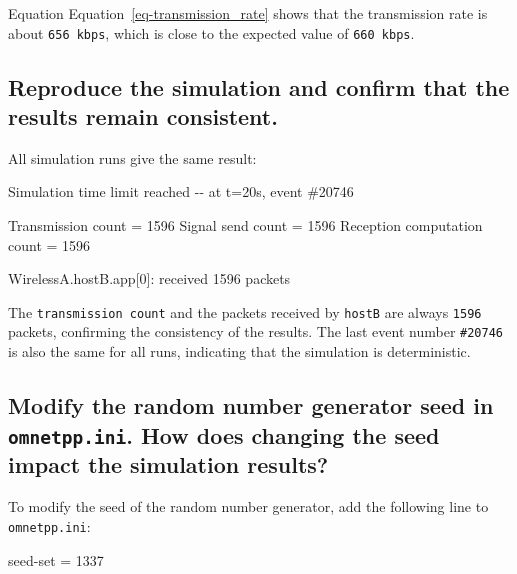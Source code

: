 \documentclass[
  letterpaper,
  DIV=11,
  numbers=noendperiod]{scrartcl}
\newenvironment{Shaded}{\begin{snugshade}}{\end{snugshade}}
\newcommand{\DataTypeTok}[1]{\textcolor[rgb]{0.68,0.00,0.00}{#1}}
\newcommand{\DecValTok}[1]{\textcolor[rgb]{0.68,0.00,0.00}{#1}}
\newcommand{\NormalTok}[1]{\textcolor[rgb]{0.00,0.23,0.31}{#1}}
\newcommand{\OtherTok}[1]{\textcolor[rgb]{0.00,0.23,0.31}{#1}}
\newcommand{\StringTok}[1]{\textcolor[rgb]{0.13,0.47,0.30}{#1}}
\begin{document}
Equation Equation~\ref{eq-transmission_rate} shows that the transmission
rate is about \texttt{656\ kbps}, which is close to the expected value
of \texttt{660\ kbps}.

\subsection{Reproduce the simulation and confirm that the results remain
consistent.}\label{reproduce-the-simulation-and-confirm-that-the-results-remain-consistent.}

All simulation runs give the same result:

\begin{Shaded}
\begin{Highlighting}[]
\NormalTok{Simulation time limit reached}
\NormalTok{  {-}{-} at t=20s, event \#20746}

\NormalTok{Transmission count = 1596}
\NormalTok{Signal send count = 1596}
\NormalTok{Reception computation count = 1596}

\NormalTok{WirelessA.hostB.app[0]:}
\NormalTok{  received 1596 packets}
\end{Highlighting}
\end{Shaded}

The \texttt{transmission\ count} and the packets received by
\texttt{hostB} are always \texttt{1596} packets, confirming the
consistency of the results. The last event number \texttt{\#20746} is
also the same for all runs, indicating that the simulation is
deterministic.

\subsection{\texorpdfstring{Modify the random number generator seed in
\texttt{omnetpp.ini}. How does changing the seed impact the simulation
results?}{Modify the random number generator seed in omnetpp.ini. How does changing the seed impact the simulation results?}}\label{modify-the-random-number-generator-seed-in-omnetpp.ini.-how-does-changing-the-seed-impact-the-simulation-results}

To modify the seed of the random number generator, add the following
line to \texttt{omnetpp.ini}:

\begin{Shaded}
\begin{Highlighting}[]
\DataTypeTok{seed{-}set }\OtherTok{=}\StringTok{ }\DecValTok{1337}
\end{Highlighting}
\end{Shaded}
\end{document}
